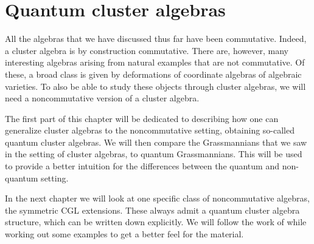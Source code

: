\chapter{Quantum cluster algebras}\label{sec:quantum_cluster_algebras}
\chaptertoc

\noindent
All the algebras that we have discussed thus far have been commutative. Indeed, a
cluster algebra is by construction commutative. There are, however, many interesting
algebras arising from natural examples that are not commutative. Of these, a broad
class is given by deformations of coordinate algebras of algebraic varieties. To also
be able to study these objects through cluster algebras, we will need a noncommutative
version of a cluster algebra.

The first part of this chapter will be dedicated to describing how one can generalize
cluster algebras to the noncommutative setting, obtaining so-called quantum cluster
algebras. We will then compare the Grassmannians that we saw in the setting of cluster
algebras, to quantum Grassmannians. This will be used to provide a better intuition for
the differences between the quantum and non-quantum setting.

In the next chapter we will look at one specific class of noncommutative algebras, the
symmetric CGL extensions. These always admit a quantum cluster algebra structure, which
can be written down explicitly. We will follow the work of
\cite{GoodearlYakimov2017QCA} while working out some examples to get a better feel for
the material.

